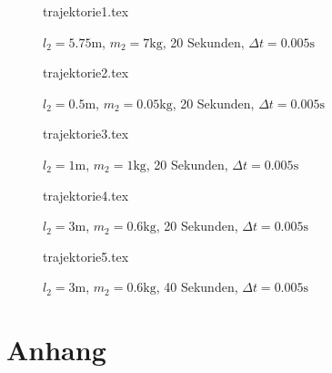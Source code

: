 \documentclass[12pt,a4paper,titlepage,headinclude,bibtotoc]{scrartcl}
\begin{document}
\begin{figure}[!htb]
	\centering
	{trajektorie1.tex}
	\caption{$l_2=5.75\si{\meter}$, $m_2=7\si{\kilo\gram}$, 20 Sekunden, $\Delta t = 0.005 \si{\second}$}
\end{figure}

\begin{figure}[!htb]
	\centering
	{trajektorie2.tex}
	\caption{$l_2=0.5\si{\meter}$, $m_2=0.05\si{\kilo\gram}$, 20 Sekunden, $\Delta t = 0.005 \si{\second}$}
\end{figure}

\begin{figure}[!htb]
	\centering
	{trajektorie3.tex}
	\caption{$l_2=1\si{\meter}$, $m_2=1\si{\kilo\gram}$, 20 Sekunden, $\Delta t = 0.005 \si{\second}$}
\end{figure}

\begin{figure}[!htb]
	\centering
	{trajektorie4.tex}
	\caption{$l_2=3\si{\meter}$, $m_2=0.6\si{\kilo\gram}$, 20 Sekunden, $\Delta t = 0.005 \si{\second}$}
\end{figure}

\begin{figure}[!htb]
	\centering
	{trajektorie5.tex}
	\caption{$l_2=3\si{\meter}$, $m_2=0.6\si{\kilo\gram}$, 40 Sekunden, $\Delta t = 0.005 \si{\second}$}
\end{figure}

\section{Anhang}
\end{document}
